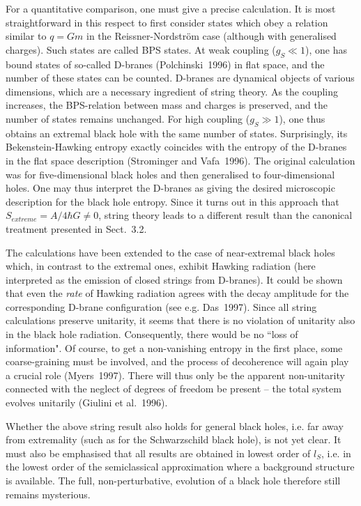 \documentclass[12pt]{article}
\begin{document}
For a quantitative comparison, one must give a precise
calculation. It is most straightforward in this respect to
first consider states which obey a relation similar to
$q=Gm$ in the Reissner-Nordstr\"om case
(although with generalised charges). Such states are called
BPS states.
 At weak coupling
($g_S\ll 1$), one has bound states of so-called D-branes
(Polchinski~1996) in flat space, and the number of these states
can be counted. D-branes are dynamical objects of various
dimensions, which are a necessary ingredient of string theory.
 As the coupling increases, the BPS-relation
between mass and charges is preserved, and the number of states
remains unchanged. For high coupling ($g_S\gg1$), one thus
obtains an extremal black hole with the same number of states.
Surprisingly, its Bekenstein-Hawking entropy exactly coincides
with the entropy of the D-branes in the flat space description
(Strominger and Vafa~1996). The original calculation was for
five-dimensional black holes and then generalised to four-dimensional
holes.
 One may thus interpret the D-branes
as giving the desired microscopic description for the black hole
entropy. Since it turns out in this approach that 
$S_{extreme}=A/4\hbar G\neq0$, string theory leads to a
different result than the canonical treatment presented in
Sect.~3.2. 

The calculations have been extended to the case of near-extremal
black holes which, in contrast to the extremal ones, exhibit
Hawking radiation (here interpreted as the emission of closed
strings from D-branes). It could be shown that even the {\em rate}
of Hawking radiation agrees with the decay amplitude for the
corresponding D-brane configuration
(see e.g. Das~1997). Since all string calculations preserve
unitarity, it seems that there is no violation of unitarity
also in the black hole radiation. Consequently, there
would be no ``loss of information". Of course, to get a
non-vanishing entropy in the first place, some coarse-graining
must be involved, and the process of decoherence will again 
play a crucial role (Myers~1997). There will thus only be the
apparent non-unitarity connected with the neglect of degrees of
freedom be present -- the total system evolves unitarily
(Giulini et al.~1996).  
 
Whether the above string result also holds for general black holes,
i.e. far away from extremality
(such as for the Schwarzschild black hole), is not yet clear.
It must also be emphasised that all results are obtained in
lowest order of $l_S$, i.e. in the lowest order of the semiclassical
approximation where a background structure is available. 
The full, non-perturbative, evolution of a black hole therefore
still remains mysterious.
\end{document}
